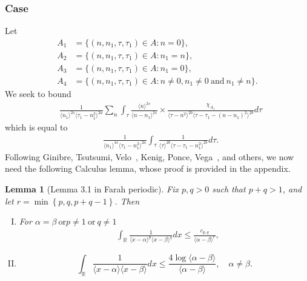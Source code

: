 \documentclass[12pt,reqno]{amsart}
\numberwithin{equation}{section}  %
\renewcommand{\cref}{\Cref}
\newcommand{\rr}{\mathbb{R}}
\newtheorem{lemma}[theorem]{Lemma}
\begin{document}
 \subsubsection{Case \cref{it-6}} 
\label{ssec:case-it-6}
Let 
%
%
\begin{align*}
A_1&=\{(n, n_1, \tau, \tau_1)\in A: n=0\},\\
A_2&=\{(n, n_1, \tau, \tau_1)\in A: n_1 = n \},\\
A_3&=\{(n, n_1, \tau, \tau_1)\in A: n_1=0 \},\\
A_4&=\{(n, n_1, \tau, \tau_1)\in A: n \neq 0, n_1 \neq 0 \ \text{and} \ n_1 \neq n \}.
\end{align*} 
%
%
%
We seek to bound
\begin{equation*}
\begin{split}
  & \frac{1}{\langle n_{1} \rangle ^{2s}
  \langle \tau_{1} - n_{1}^{2} \rangle
  ^{2a}} \sum_{n} \int_{\tau} \frac{\langle n \rangle ^{2s}}{\langle
  n - n_{1}\rangle ^{2s}}  \times \frac{\chi_{A_{1}}}{\langle
  \tau - n^{2}  \rangle^{2b}  \langle \tau - \tau_{1} - (n - n_{1})^{2}
  \rangle^{2b}} d \tau 
\end{split}
\end{equation*}
which is equal to 
%
\begin{equation}
  \label{case-1-term-1-reduc}
\begin{split}
  & \frac{1}{\langle n_{1} \rangle ^{4s}
  \langle \tau_{1} - n_{1}^{2} \rangle
  ^{2a}} \int_{\tau} \frac{1}{\langle
  \tau  \rangle^{2b}  \langle \tau - \tau_{1} - n_{1}^{2}
  \rangle^{2b}} d \tau.
\end{split}
\end{equation}
%
Following Ginibre, Tsutsumi, Velo~\cite{Ginibre:1997fk}, Kenig, Ponce, Vega~\cite{Kenig:1996aa}, and others,
we now need the following Calculus lemma, whose proof is provided in the
appendix.
%
%
%
%
%
%
%
\begin{lemma}[Lemma 3.1 in Farah periodic]
	\label{lem:calc}
 Fix $p, q > 0$ such that $p +q >1$, and let $r =\min\left\{p, q, p+q-1
 \right\}$. Then 
 \begin{enumerate}[(I)]
   \item
For $\alpha=\beta \ \text{or} p \neq 1 \ \text{or} \ q \neq 1$
 \begin{equation*}
\begin{split}
  & \int_{\rr} \frac{1}{\langle x - \alpha \rangle ^{p} \langle x -
  \beta \rangle
  ^{q}} d x
  \le \frac{c_{p,q}}{\langle \alpha - \beta \rangle ^{r}}, 
  \end{split}
\end{equation*}
  \item
    \begin{equation*}
  \int_{\rr} \frac{1}{\langle x - \alpha \rangle  \langle x - \beta
  \rangle} d x
  \le  \frac{4 \log \langle \alpha - \beta \rangle}{\langle \alpha - \beta
  \rangle}, \quad \alpha \neq \beta.
\end{equation*}
\end{enumerate}
\end{lemma}
\end{document}
